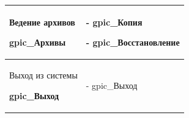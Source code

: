 \begin{table}[h!p]
\begin{tabular}{|p{8cm}|p{8cm}|}
Ведение архивов \par
\hspace{0pt} \par
\textbf{gpic\_Архивы}
&
- gpic\_Копия \par
- gpic\_Восстановление
\\ \hline


Выход из системы \par
\hspace{0pt} \par
\textbf{gpic\_Выход}
&
- gpic\_Выход
\\ \hline


    \end{tabular}
\end{table}

\newpage
